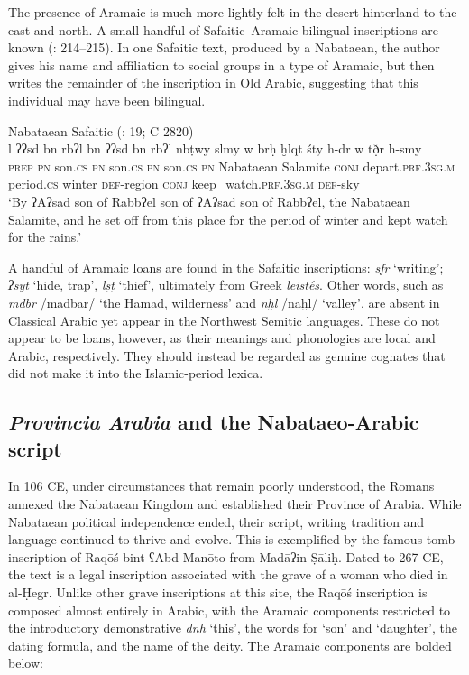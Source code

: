 \documentclass[output=paper]{langsci/langscibook}
\begin{document}
The presence of Aramaic is much more lightly felt in the desert hinterland to the east and north. A small handful of Safaitic--Aramaic bilingual inscriptions are known (\citealt{Hayajneh2009}: 214--215). In one Safaitic text, produced by a Nabataean, the author gives his name and affiliation to social groups in a type of Aramaic, but then writes the remainder of the inscription in Old Arabic, suggesting that this individual may have been bilingual. 

\ea Nabataean Safaitic (\citealt{Al-Jallad2015Safaitic}: 19; C 2820) \\ 
\gll l ʔʔsd bn rbʔl bn ʔʔsd bn rbʔl nbṭwy slmy w brḥ ḫlqt śty h-dr w tð̣r h-smy \\
\textsc{prep} \textsc{pn} son.\textsc{cs} \textsc{pn} son.\textsc{cs} \textsc{pn} son.\textsc{cs} \textsc{pn} Nabataean Salamite \textsc{conj} depart.\textsc{prf.3sg.m} period.\textsc{cs} winter \textsc{def}-region \textsc{conj} keep\_watch.\textsc{prf.3sg.m} \textsc{def}-sky \\
\glt `By ʔAʔsad son of Rabbʔel son of  ʔAʔsad son of Rabbʔel, the Nabataean Salamite, and he set off from this place for the period of winter and kept watch for the rains.' \\
\z

A handful of Aramaic loans are found in the Safaitic inscriptions: \textit{sfr} ‘writing’; \textit{ʔsyt} ‘hide, trap’, \textit{lṣṭ} ‘thief’, ultimately from Greek \textit{lēistḗs}. Other words, such as \textit{mdbr} /madbar/ ‘the Hamad, wilderness’ and \textit{nḫl} /naḫl/ ‘valley’, are absent in Classical Arabic yet appear in the Northwest Semitic languages. These do not appear to be loans, however, as their meanings and phonologies are local and Arabic, respectively. They should instead be regarded as genuine cognates that did not make it into the Islamic-period lexica. 

\subsection{\textit{Provincia Arabia} and the Nabataeo-Arabic script}\label{Provincia}
In 106 CE, under circumstances that remain poorly understood, the Romans annexed the Nabataean Kingdom and established their Province of Arabia. While Nabataean political independence ended, their script, writing tradition and language continued to thrive and evolve. This is exemplified by the famous tomb inscription of Raqōś bint ʕAbd-Manōto from Madāʔin Ṣāliḥ. Dated to 267 CE, the text is a legal inscription associated with the grave of a woman who died in al-Ḥegr. Unlike other grave inscriptions at this site, the Raqōś inscription is composed almost entirely in Arabic, with the Aramaic components restricted to the introductory demonstrative \textit{dnh} ‘this’, the words for ‘son’ and ‘daughter’, the dating formula, and the name of the deity. The Aramaic components are bolded below:
\end{document}
